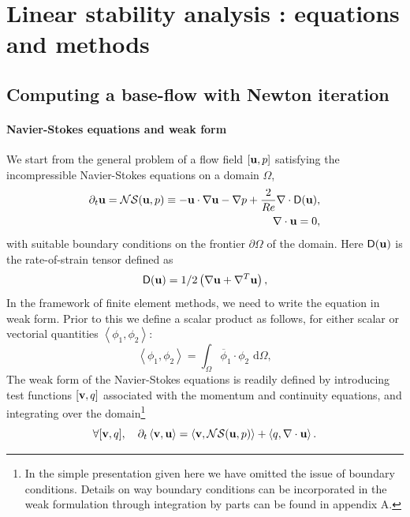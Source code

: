 \documentclass[twocolumn,10pt]{asme2ej}
\newcommand{\be}[1]{ \begin{equation} \label{#1}}
\newcommand{\ee}{\end{equation}}
\begin{document}

\section{Linear stability analysis : equations and methods}
\vspace{.2cm}

\subsection{Computing a base-flow with Newton iteration}
\vspace{.2cm}

\paragraph{Navier-Stokes equations and weak form}

We start from the general problem of a flow field $[{\bf u},p]$ satisfying the incompressible Navier-Stokes equations on a domain $\Omega$,
\begin{eqnarray} \label{NSprimitive}
\partial_t {\bf u} = {\cal NS} ({\bf u},p)
\equiv - {\bf u} \cdot \nabla {\bf u} - \nabla p + \frac{2}{Re}  \nabla \cdot {\mathsf{D}}({\bf u}),  \\
\nabla \cdot {\bf u} = 0,
\end{eqnarray}
with suitable boundary conditions on the frontier $\partial \Omega$ of the domain.
Here $ {\mathsf{D}}({\bf u}) $ is the rate-of-strain tensor defined as
$$
 {\mathsf{D}}({\bf u}) = 1/2
\left( \nabla {\bf u} +  \nabla^T  {\bf u}\right),
$$ 
In the framework of finite element methods, we need to write the equation in weak form.
Prior to this we define a scalar product as follows, for either scalar or vectorial quantities 
$\left< \phi_1, \phi_2 \right> $:
$$
\left< \phi_1, \phi_2 \right> = \int_\Omega \overline{\phi}_1 \cdot \phi_2   \mbox{ d} \Omega,
$$
The weak form of the Navier-Stokes equations is readily defined by introducing test functions 
$[{\bf v},q]$ associated with the momentum and continuity equations, and integrating over the domain\footnote{In the simple presentation given here we have omitted the issue of boundary conditions. Details on way boundary conditions can be incorporated in the weak formulation through integration by parts can be found in appendix A.}
\be{NSweak}
\forall [{\bf v},q], \quad \partial_t \left< {\bf v}, {\bf u}\right> = \left< {\bf v} , {\cal NS} ({\bf u},p) \right> + \left< q, \nabla \cdot {\bf u}\right>.
\ee
\end{document}
